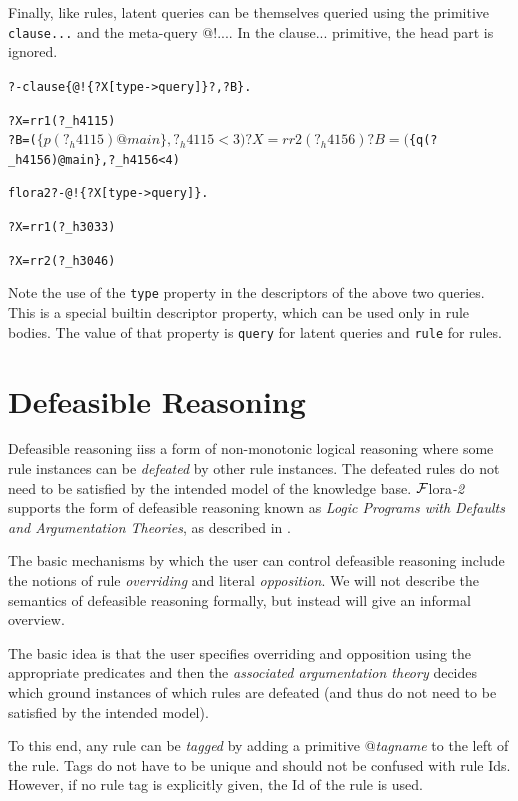 \documentclass[11pt]{article}
\newcommand{\FLSYSTEM}{{\mbox{\sc ${\cal F}${lora}\rm\emph{-2}}}\xspace}
\newcommand{\prompt}{flora2 ?- }
\begin{document}
Finally, like rules, latent queries can be themselves queried using the
primitive \texttt{clause{...}}  and the meta-query @!{...}. In the
clause{...} primitive, the head part is ignored.
\begin{alltt}
  ?- clause\{@!\{?X[type->query]\} ?,?B\}.

  ?X = rr1(?_h4115)
  ?B = ($\{p(?_h4115)@main\}, ?_h4115 < 3)

  ?X = rr2(?_h4156)
  ?B = ($\{q(?_h4156)@main\}, ?_h4156 < 4)

  \prompt @!\{?X[type->query]\}.

  ?X = rr1(?_h3033)

  ?X = rr2(?_h3046)
\end{alltt}
Note the use of the \texttt{type} property in the descriptors of the above
two queries. This is a special builtin descriptor property, which can be
used only in rule bodies. The value of that property is \texttt{query} for
latent queries and \texttt{rule} for rules.  


\section{Defeasible Reasoning}
\label{sec-defeasible}

Defeasible reasoning iiss a form of non-monotonic logical reasoning where
some rule instances can be \emph{defeated} by other rule instances. The
defeated rules do not need to be satisfied by the intended model of the
knowledge base. \FLSYSTEM supports the form of defeasible reasoning known as
\emph{Logic Programs with Defaults and Argumentation Theories}, as
described in \cite{lpda-iclp-09}.  

The basic mechanisms by which the user can control defeasible
reasoning include the notions of rule \emph{overriding} and literal
\emph{opposition}.  We will not describe the semantics of defeasible
reasoning formally, but instead will give an informal overview.

The basic idea is that the user specifies overriding and
opposition using the appropriate predicates and then the \emph{associated
argumentation theory} decides which ground instances of which rules are
defeated (and thus do not need to be satisfied by the intended model).  

To this end, any rule can be \emph{tagged} by adding
a primitive @{\emph{tagname}} to the left of the rule. Tags do not have to
be unique and should not be confused with rule Ids. However, if no rule tag
is explicitly given, the Id of the rule is used.
\end{document}
